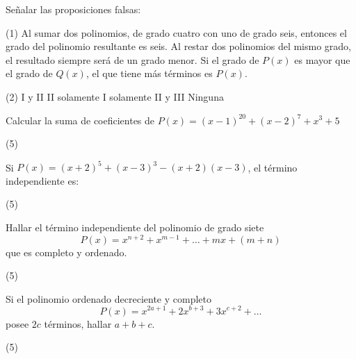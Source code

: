 \begin{multicols}{2}

    \begin{exercise}
        Señalar las proposiciones falsas:
        \begin{tasks}[label=\Roman*.](1)
            \task Al sumar dos polinomios, de grado cuatro con uno de grado seis, entonces el grado del polinomio resultante es seis.
            \task Al restar dos polinomios del mismo grado, el resultado siempre será de un grado menor.
            \task Si el grado de $P(x)$ es mayor que el grado de $Q(x)$, el que tiene más términos es $P(x)$.
        \end{tasks}
        \begin{tasks}(2)
            \task I y II
            \task II solamente
            \task I solamente
            \task II y III
            \task Ninguna
        \end{tasks}
    \end{exercise}

    \begin{exercise}
        Calcular la suma de coeficientes de $P(x) = (x - 1)^{20} + (x - 2)^7 + x^3 + 5$
        \begin{tasks}(5)
        \end{tasks}
    \end{exercise}

    \begin{exercise}
        Si $P(x) = (x + 2)^5 + (x - 3)^3 - (x + 2)(x - 3)$, el término independiente es:
        \begin{tasks}(5)
        \end{tasks}
    \end{exercise}

    \begin{exercise}
        Hallar el término independiente del polinomio de grado siete
        \[
            P(x) = x^{n + 2} + x^{m - 1} + \ldots + mx + (m + n)
        \]
        que es completo y ordenado.
        \begin{tasks}(5)
        \end{tasks}
    \end{exercise}

    \begin{exercise}
        Si el polinomio ordenado decreciente y completo
        \[
            P(x) = x^{2a + 1} + 2x^{b + 3} + 3x^{c + 2} + \ldots
        \]
        posee $2c$ términos, hallar $a + b + c$.
        \begin{tasks}(5)
        \end{tasks}
    \end{exercise}


\end{multicols}
